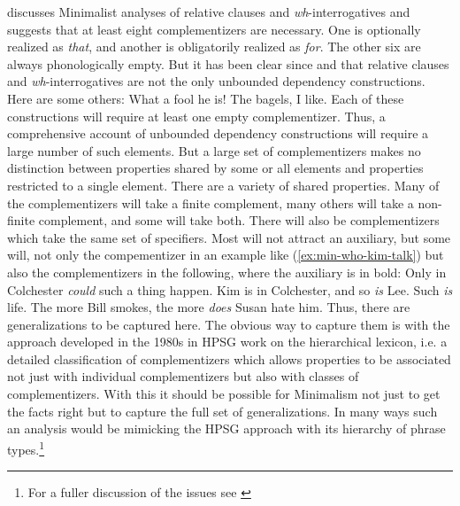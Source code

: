 \documentclass[output=paper]{langsci/langscibook}
\begin{document}
\citet{Borsley2006a,Borsley.2017} discusses Minimalist analyses of relative clauses and \textit{wh}-interrogatives and suggests that at least eight complementizers are necessary. One is optionally realized as \textit{that}, and another is obligatorily realized as \textit{for}. The other six are always phonologically empty. But it has been clear since \citet{Ross67} and \citet{Chomsky.1977} that relative clauses and \textit{wh}-interrogatives are not the only unbounded dependency constructions. Here are some others:
\eal
\ex What a fool he is! 
\ex The bagels, I like.	
\zl 
Each of these constructions will require at least one empty complementizer. Thus, a comprehensive account of unbounded dependency constructions will require a large number of such elements. But a large set of complementizers makes no distinction between properties shared by some or all elements and properties restricted to a single element. There are a variety of shared properties. Many of the complementizers will take a finite complement, many others will take a non-finite complement, and some will take both. There will also be complementizers which take the same set of specifiers. Most will not attract an auxiliary, but some will, not only the compementizer in an example like (\ref{ex:min-who-kim-talk}) but also the complementizers in the following, where the auxiliary is in bold:
\eal
\ex Only in Colchester \textit{could} such a thing happen.
\ex Kim is in Colchester, and so \textit{is} Lee.
\ex Such \textit{is} life.
\ex The more Bill smokes, the more \textit{does} Susan hate him.
\zl
Thus, there are generalizations to be captured here. The obvious way to capture them is with the approach developed in the 1980s in HPSG work on the hierarchical lexicon, i.e. a detailed classification of complementizers which allows properties to be associated not just with individual complementizers but also with classes of complementizers. With this it should be possible for Minimalism not just to get the facts right but to capture the full set of generalizations. In many ways such an analysis would be mimicking the HPSG approach with its hierarchy of phrase types.\footnote{%
For a fuller discussion of the issues see \citet{Borsley2006a,Borsley.2017}%
}	
\end{document}
